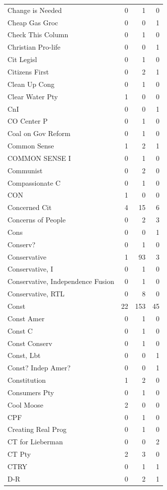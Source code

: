 \begin{supertabular}{lrrr}
Change is Needed & 0 & 1 & 0\\
Cheap Gas Groc & 0 & 0 & 1\\
Check This Column & 0 & 1 & 0\\
Christian Pro-life & 0 & 0 & 1\\
Cit Legisl & 0 & 1 & 0\\
Citizens First & 0 & 2 & 1\\
Clean Up Cong & 0 & 1 & 0\\
Clear Water Pty & 1 & 0 & 0\\
CnI & 0 & 0 & 1\\
CO Center P & 0 & 1 & 0\\
Coal on Gov Reform & 0 & 1 & 0\\
Common Sense & 1 & 2 & 1\\
COMMON SENSE I & 0 & 1 & 0\\
Communist & 0 & 2 & 0\\
Compassionate C & 0 & 1 & 0\\
CON & 1 & 0 & 0\\
Concerned Cit & 4 & 15 & 6\\
Concerns of People & 0 & 2 & 3\\
Cons & 0 & 0 & 1\\
Conserv? & 0 & 1 & 0\\
Conservative & 1 & 93 & 3\\
Conservative, I & 0 & 1 & 0\\
Conservative, Independence Fusion & 0 & 1 & 0\\
Conservative, RTL & 0 & 8 & 0\\
Const & 22 & 153 & 45\\
Const Amer & 0 & 1 & 0\\
Const C & 0 & 1 & 0\\
Const Conserv & 0 & 1 & 0\\
Const, Lbt & 0 & 0 & 1\\
Const? Indep Amer? & 0 & 0 & 1\\
Constitution & 1 & 2 & 0\\
Consumers Pty & 0 & 1 & 0\\
Cool Moose & 2 & 0 & 0\\
CPF & 0 & 1 & 0\\
Creating Real Prog & 0 & 1 & 0\\
CT for Lieberman & 0 & 0 & 2\\
CT Pty & 2 & 3 & 0\\
CTRY & 0 & 1 & 1\\
D-R & 0 & 2 & 1\\

\end{supertabular}
